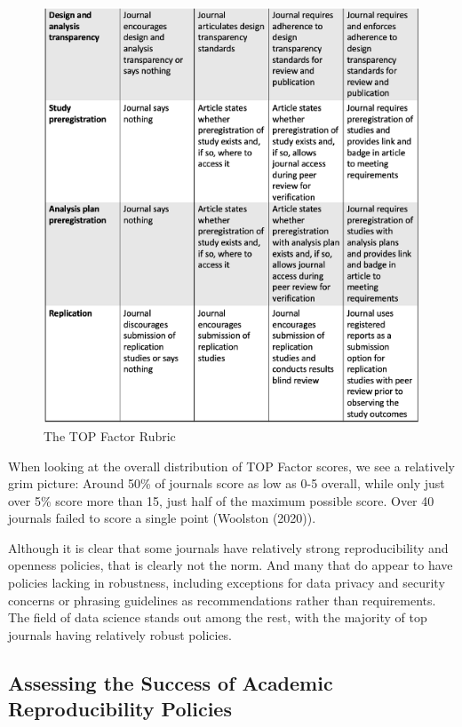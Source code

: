 \documentclass[12pt,twoside]{reedthesis}
\begin{document}
\begin{figure}

{\centering \includegraphics[width=1\linewidth]{figure/top-2} 

}

\caption{The TOP Factor Rubric}\label{fig:top-factor2}
\end{figure}
When looking at the overall distribution of TOP Factor scores, we see a relatively grim picture: Around 50\% of journals score as low as 0-5 overall, while only just over 5\% score more than 15, just half of the maximum possible score. Over 40 journals failed to score a single point (Woolston (2020)).

Although it is clear that some journals have relatively strong reproducibility and openness policies, that is clearly not the norm. And many that do appear to have policies lacking in robustness, including exceptions for data privacy and security concerns or phrasing guidelines as recommendations rather than requirements. The field of data science stands out among the rest, with the majority of top journals having relatively robust policies.

\hypertarget{assessing-the-success-of-academic-reproducibility-policies}{%
\subsection{Assessing the Success of Academic Reproducibility Policies}\label{assessing-the-success-of-academic-reproducibility-policies}}
\end{document}
